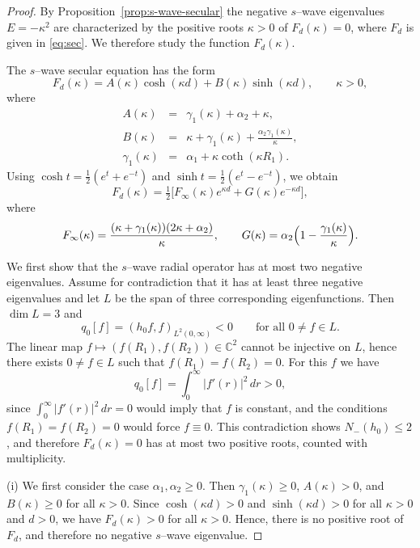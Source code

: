 \documentclass[a4paper,11pt]{article}
\numberwithin{equation}{section}
\theoremstyle{definition}
\theoremstyle{remark}
\begin{document}
\begin{proof}
By Proposition~\ref{prop:s-wave-secular} the negative $s$--wave eigenvalues
$E=-\kappa^2$ are characterized by the positive roots $\kappa>0$ of
$F_d(\kappa)=0$, where $F_d$ is given in \eqref{eq:sec}.
We therefore study the function $F_d(\kappa)$.

The $s$--wave secular equation has the form
$$
F_d(\kappa)
=
A(\kappa)\cosh(\kappa d)+B(\kappa)\sinh(\kappa d),
\qquad \kappa>0,
$$
where
\begin{eqnarray*}
A(\kappa)&=&\gamma_1(\kappa)+\alpha_2+\kappa,\\
B(\kappa)&=&\kappa+\gamma_1(\kappa)+\frac{\alpha_2\gamma_1(\kappa)}{\kappa},\\
\gamma_1(\kappa)&=&\alpha_1+\kappa\coth(\kappa R_1).
\end{eqnarray*}
Using $\cosh t=\tfrac12(e^t+e^{-t})$ and $\sinh t=\tfrac12(e^t-e^{-t})$, we obtain
\begin{equation}\label{eq:Fd-split-new}
F_d(\kappa)=\tfrac12\bigl[F_\infty(\kappa)e^{\kappa d}+G(\kappa)e^{-\kappa d}\bigr],
\end{equation}
where
\begin{equation}\label{eq:Finfty-G}
F_\infty(\kappa)=\frac{(\kappa+\gamma_1(\kappa))(2\kappa+\alpha_2)}{\kappa},\qquad
G(\kappa)=\alpha_2\Bigl(1-\frac{\gamma_1(\kappa)}{\kappa}\Bigr).
\end{equation}

\smallskip
\noindent
We first show that the $s$--wave radial operator has at most two negative
eigenvalues.
Assume for contradiction that it has at least three negative eigenvalues and
let $L$ be the span of three corresponding eigenfunctions.
Then $\dim L=3$ and
$$
q_0[f]=(h_0f,f)_{L^2(0,\infty)}<0\qquad \text{for all }0\ne f\in L.
$$
The linear map $f\mapsto (f(R_1),f(R_2))\in\mathbb C^2$ cannot be injective on
$L$, hence there exists $0\ne f\in L$ such that $f(R_1)=f(R_2)=0$.
For this $f$ we have
$$
q_0[f]=\int_0^\infty |f'(r)|^2\,dr>0,
$$
since $\int_0^\infty |f'(r)|^2\,dr=0$ would imply that $f$ is constant, and the
conditions $f(R_1)=f(R_2)=0$ would force $f\equiv0$.
This contradiction shows $N_-(h_0)\le2$, and therefore $F_d(\kappa)=0$ has at
most two positive roots, counted with multiplicity.

\smallskip
\noindent
(i) We first consider the case $\alpha_1,\alpha_2\ge0$.
Then $\gamma_1(\kappa)\ge0$, $A(\kappa)>0$, and $B(\kappa)\ge0$ for all
$\kappa>0$.
Since $\cosh(\kappa d)>0$ and $\sinh(\kappa d)>0$ for all $\kappa>0$ and $d>0$,
we have $F_d(\kappa)>0$ for all $\kappa>0$.
Hence, there is no positive root of $F_d$, and therefore no negative $s$--wave
eigenvalue.


\end{proof}
\end{document}

